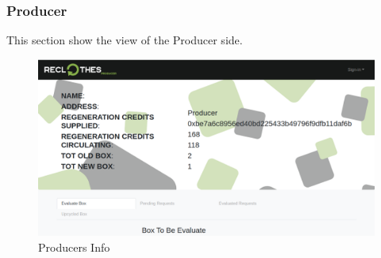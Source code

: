 {\subsubsection{Producer}

This section show the view of the Producer side.

\begin{figure}[h!]
    \centering
    \includegraphics[totalheight=7.5cm]{img/dapp/producer-info.png}
    \caption{Producers Info}
    \label{fig:producer-info}
\end{figure}

}